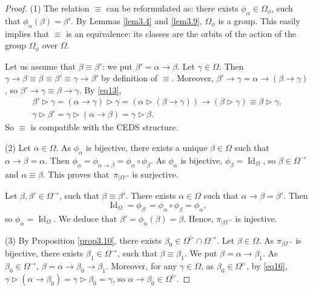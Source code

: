 \documentclass[10pt,a4paper]{amsart}
\numberwithin{equation}{section}
\begin{document}
\begin{proof}
(1) The relation $\equiv$ can be reformulated as: there exists $\phi_\alpha\in \Omega_\phi$, such that $\phi_\alpha(\beta)=\beta'$. By Lemmas \ref{lem3.4} and \ref{lem3.9}, $\Omega_\phi$ is a group.
This easily implies that $\equiv$ is an equivalence: its classes are the orbits of the action of the group $\Omega_\phi$ over $\Omega$.

Let us assume that $\beta \equiv \beta'$: we put $\beta'=\alpha\rightarrow \beta$. Let $\gamma \in \Omega$. Then $\gamma \rightarrow \beta\equiv \beta\equiv \beta'\equiv \gamma \rightarrow \beta'$ by definition of $\equiv$.
Moreover, $\beta' \rightarrow \gamma=\alpha \rightarrow (\beta \rightarrow \gamma)$, so $\beta'\rightarrow \gamma\equiv \beta \rightarrow \gamma$. By \eqref{eq13},
\begin{gather*}
\beta'\triangleright \gamma=(\alpha \rightarrow \gamma)\triangleright \gamma=(\alpha \triangleright (\beta \rightarrow \gamma))\rightarrow (\beta \triangleright \gamma)\equiv \beta \triangleright \gamma,\\
\gamma \triangleright \beta'=\gamma \triangleright(\alpha \rightarrow \beta)=\gamma \triangleright \beta.
\end{gather*}
So $\equiv$ is compatible with the CEDS structure.

(2) Let $\alpha \in \Omega$. As $\phi_\alpha$ is bijective, there exists a unique $\beta \in \Omega$ such that $\alpha \rightarrow \beta=\alpha$. Then
$\phi_\alpha=\phi_{\alpha \rightarrow \beta}=\phi_\alpha\circ \phi_\beta$.
As $\phi_\alpha$ is bijective, $\phi_\beta=\operatorname{Id}_\Omega$, so $\beta \in \Omega^\rightarrow$ and $\alpha \equiv \beta$. This proves that~$\pi_{\mid \Omega^\rightarrow}$ is surjective.

Let $\beta,\beta'\in \Omega^\rightarrow$, such that $\beta\equiv \beta'$. There exists $\alpha\in \Omega$ such that $\alpha\rightarrow\beta=\beta'$. Then
\[\operatorname{Id}_\Omega=\phi_{\beta'}=\phi_{\alpha}\circ \phi_{\beta}=\phi_\alpha,\]
so $\phi_\alpha=\operatorname{Id}_\Omega$. We deduce that $\beta'=\phi_\alpha(\beta)=\beta$. Hence, $\pi_{\mid \Omega^\rightarrow}$ is injective.

(3) By Proposition \ref{prop3.10}, there exists $\beta_0\in \Omega^\triangleright \cap \Omega^\rightarrow$.
Let $\beta \in \Omega$. As $\pi_{\mid \Omega^\rightarrow}$ is bijective, there exists $\beta_1\in \Omega^\rightarrow$, such that $\beta\equiv \beta_1$. We put $\beta=\alpha \rightarrow \beta_1$. As $\beta_0\in \Omega^\rightarrow$,
$\beta=\alpha \rightarrow {\beta_0\rightarrow \beta_1}$. Moreover, for any $\gamma \in \Omega$, as $\beta_0\in \Omega^\triangleright$, by \eqref{eq16},
$\gamma \triangleright (\alpha \rightarrow \beta_0)=\gamma \triangleright \beta_0=\gamma$,
so $\alpha \rightarrow \beta_0\in \Omega^\triangleright$. \end{proof}
\end{document}
